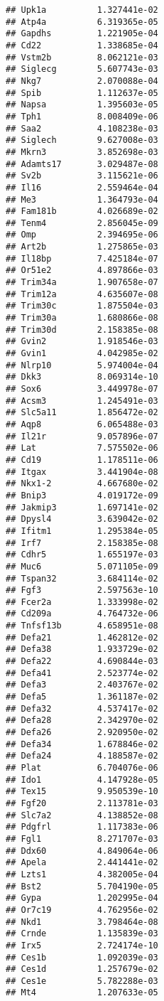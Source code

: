 \documentclass[
]{article}
\begin{document}
\begin{verbatim}
## Upk1a          1.327441e-02
## Atp4a          6.319365e-05
## Gapdhs         1.221905e-04
## Cd22           1.338685e-04
## Vstm2b         8.062121e-03
## Siglecg        5.607743e-03
## Nkg7           2.070088e-04
## Spib           1.112637e-05
## Napsa          1.395603e-05
## Tph1           8.008409e-06
## Saa2           4.108238e-03
## Siglech        9.627008e-03
## Mkrn3          3.852698e-03
## Adamts17       3.029487e-08
## Sv2b           3.115621e-06
## Il16           2.559464e-04
## Me3            1.364793e-04
## Fam181b        4.026689e-02
## Tenm4          2.856045e-09
## Omp            2.394695e-06
## Art2b          1.275865e-03
## Il18bp         7.425184e-07
## Or51e2         4.897866e-03
## Trim34a        1.907658e-07
## Trim12a        4.635607e-08
## Trim30c        1.875504e-03
## Trim30a        1.680866e-08
## Trim30d        2.158385e-08
## Gvin2          1.918546e-03
## Gvin1          4.042985e-02
## Nlrp10         5.974004e-04
## Dkk3           8.069314e-10
## Sox6           3.449978e-07
## Acsm3          1.245491e-03
## Slc5a11        1.856472e-02
## Aqp8           6.065488e-03
## Il21r          9.057896e-07
## Lat            7.575502e-06
## Cd19           1.178511e-06
## Itgax          3.441904e-08
## Nkx1-2         4.667680e-02
## Bnip3          4.019172e-09
## Jakmip3        1.697141e-02
## Dpysl4         3.639042e-02
## Ifitm1         1.295384e-05
## Irf7           2.158385e-08
## Cdhr5          1.655197e-03
## Muc6           5.071105e-09
## Tspan32        3.684114e-02
## Fgf3           2.597563e-10
## Fcer2a         1.333998e-02
## Cd209a         4.764732e-06
## Tnfsf13b       4.658951e-08
## Defa21         1.462812e-02
## Defa38         1.933729e-02
## Defa22         4.690844e-03
## Defa41         2.523774e-02
## Defa3          2.403767e-02
## Defa5          1.361187e-02
## Defa32         4.537417e-02
## Defa28         2.342970e-02
## Defa26         2.920950e-02
## Defa34         1.678846e-02
## Defa24         4.188587e-02
## Plat           6.704076e-06
## Ido1           4.147928e-05
## Tex15          9.950539e-10
## Fgf20          2.113781e-03
## Slc7a2         4.138852e-08
## Pdgfrl         1.117383e-06
## Fgl1           8.271707e-03
## Ddx60          4.849064e-06
## Apela          2.441441e-02
## Lzts1          4.382005e-04
## Bst2           5.704190e-05
## Gypa           1.202995e-04
## Or7c19         4.762956e-02
## Nkd1           3.798464e-08
## Crnde          1.135839e-03
## Irx5           2.724174e-10
## Ces1b          1.092039e-03
## Ces1d          1.257679e-02
## Ces1e          5.782288e-03
## Mt4            1.207633e-05

\end{verbatim}
\end{document}
